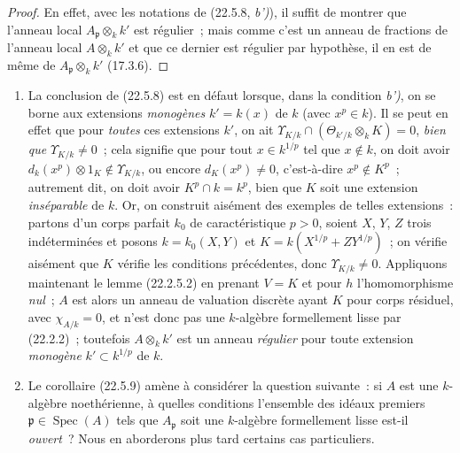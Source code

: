 \begin{proof}
En effet, avec les notations de (22.5.8, \emph{b')}), il suffit de montrer que
l'anneau local $A_{\mathfrak p}\otimes_kk'$ est régulier~; mais comme c'est un
anneau de fractions de l'anneau local $A\otimes_kk'$ et que ce dernier est
régulier par hypothèse, il en est de même de $A_{\mathfrak p}\otimes_kk'$
(17.3.6).
\end{proof}

\begin{remarks}[22.5.10]
\label{0.22.5.10-fr}
\begin{enumerate}
  \item[\rm(i)] La conclusion de (22.5.8) est en défaut lorsque, dans la
  condition \emph{b')}, on se borne aux extensions \emph{monogènes} $k'=k(x)$ de $k$
  (avec $x^p\in k$). Il se peut en effet que pour \emph{toutes} ces extensions $k'$,
  on ait
  $\Upsilon_{K/k}\cap(\Theta_{k'/k}\otimes_kK)=0$, \emph{bien que}
  $\Upsilon_{K/k}\neq0$~; cela signifie que pour tout $x\in k^{1/p}$ tel que
  $x\notin k$, on doit avoir
  $d_k(x^p)\otimes1_K\notin\Upsilon_{K/k}$, ou encore $d_K(x^p)\neq0$,
  c'est-à-dire $x^p\notin K^p$~; autrement dit, on doit avoir
  $K^p\cap k=k^p$, bien que $K$ soit une extension \emph{inséparable} de $k$.
  Or, on construit aisément des exemples de telles extensions~: partons d'un
  corps parfait $k_0$ de caractéristique $p>0$, soient $X$, $Y$, $Z$ trois
  indéterminées et posons $k=k_0(X,Y)$ et
  $K=k(X^{1/p}+ZY^{1/p})$~; on vérifie aisément que $K$ vérifie les conditions
  précédentes, donc $\Upsilon_{K/k}\neq0$. Appliquons maintenant le lemme
  (22.2.5.2) en prenant $V=K$ et pour $h$ l'homomorphisme \emph{nul}~; $A$ est alors
  un anneau de valuation discrète ayant $K$ pour corps résiduel, avec
  $\chi_{A/k}=0$, et n'est donc pas une $k$-algèbre formellement lisse par
  (22.2.2)~; toutefois $A\otimes_kk'$ est un anneau \emph{régulier} pour toute
  extension \emph{monogène} $k'\subset k^{1/p}$ de $k$.


  \item[\rm(ii)] Le corollaire (22.5.9) amène à considérer la question
  suivante~: si $A$ est une $k$-algèbre noethérienne, à quelles conditions
  l'ensemble des idéaux premiers $\mathfrak p\in\operatorname{Spec}(A)$ tels que
  $A_{\mathfrak p}$ soit une $k$-algèbre formellement lisse est-il
  \emph{ouvert}~? Nous en aborderons plus tard certains cas particuliers.
\end{enumerate}
\end{remarks}

